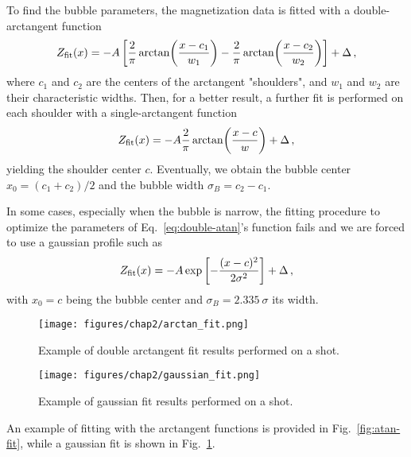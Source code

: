 To find the bubble parameters, the magnetization data is fitted with a double-arctangent function
\begin{equation}
    Z_{\rm fit}(x) = -A \left[\frac{2}{\pi}\arctan(\frac{x-c_1}{w_1}) - \frac{2}{\pi}\arctan(\frac{x-c_2}{w_2})\right] + \Delta\, ,
    \label{eq:double-atan}
\end{equation}
where $c_1$ and $c_2$ are the centers of the arctangent "shoulders", and $w_1$ and $w_2$ are their characteristic widths. Then, for a better result, a further fit is performed on each shoulder with a single-arctangent function
\begin{equation*}
    Z_{\rm fit}(x) = -A \frac{2}{\pi}\arctan(\frac{x-c}{w}) + \Delta\, ,
\end{equation*}
yielding the shoulder center $c$. Eventually, we obtain the bubble center $x_0 = (c_1 + c_2)/2$ and the bubble width $\sigma_B = c_2 - c_1$.

In some cases, especially when the bubble is narrow, the fitting procedure to optimize the parameters of Eq.\ \eqref{eq:double-atan}'s function fails and we are forced to use a gaussian profile such as
\begin{equation*}
    Z_{\rm fit}(x) = - A \exp\left[-\frac{(x-c)^2}{2\sigma^2}\right] + \Delta\, ,
\end{equation*}
with $x_0 = c$ being the bubble center and $\sigma_B = \num{2.335}\ \sigma$ its width.

\begin{figure}[h!]
    \centering
    \begin{minipage}[t]{0.47 \textwidth}
        \centering
        \texttt{[image: figures/chap2/arctan\_fit.png]}
        \caption{Example of double arctangent fit results performed on a shot.}
        \label{fig:atan-fit}
    \end{minipage}
    \hspace{0.02\textwidth}
    \begin{minipage}[t]{0.47 \textwidth}
        \centering
        \texttt{[image: figures/chap2/gaussian\_fit.png]}
        \caption{Example of gaussian fit results performed on a shot.}
        \label{fig:gaussian-fit}
    \end{minipage}
\end{figure}

An example of fitting with the arctangent functions is provided in Fig.\ \ref{fig:atan-fit}, while a gaussian fit is shown in Fig.\ \ref{fig:gaussian-fit}.

